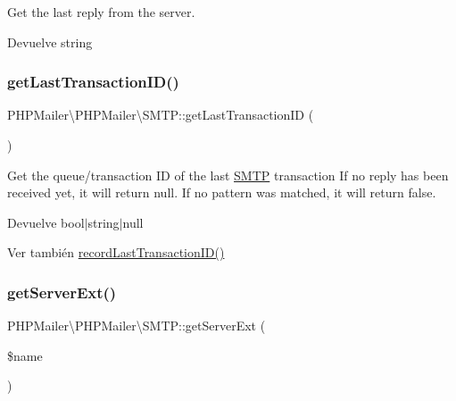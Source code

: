 Get the last reply from the server.

\begin{DoxyReturn}{Devuelve}
string 
\end{DoxyReturn}
\mbox{\label{classPHPMailer_1_1PHPMailer_1_1SMTP_ab0cf48b13d004a3d70fffca245bbf170}} 
\subsubsection{\texorpdfstring{get\+Last\+Transaction\+I\+D()}{getLastTransactionID()}}
{\footnotesize\ttfamily P\+H\+P\+Mailer\textbackslash{}\+P\+H\+P\+Mailer\textbackslash{}\+S\+M\+T\+P\+::get\+Last\+Transaction\+ID (\begin{DoxyParamCaption}{ }\end{DoxyParamCaption})}

Get the queue/transaction ID of the last \hyperlink{classPHPMailer_1_1PHPMailer_1_1SMTP}{S\+M\+TP} transaction If no reply has been received yet, it will return null. If no pattern was matched, it will return false.

\begin{DoxyReturn}{Devuelve}
bool$\vert$string$\vert$null
\end{DoxyReturn}
\begin{DoxySeeAlso}{Ver también}
\hyperlink{classPHPMailer_1_1PHPMailer_1_1SMTP_a7ca35ef525499613bea7afe470e570bd}{record\+Last\+Transaction\+I\+D()} 
\end{DoxySeeAlso}
\mbox{\label{classPHPMailer_1_1PHPMailer_1_1SMTP_a2865c274f5d083154702fc3657387efc}} 
\subsubsection{\texorpdfstring{get\+Server\+Ext()}{getServerExt()}}
{\footnotesize\ttfamily P\+H\+P\+Mailer\textbackslash{}\+P\+H\+P\+Mailer\textbackslash{}\+S\+M\+T\+P\+::get\+Server\+Ext (\begin{DoxyParamCaption}\item[{}]{\$name }\end{DoxyParamCaption})}

